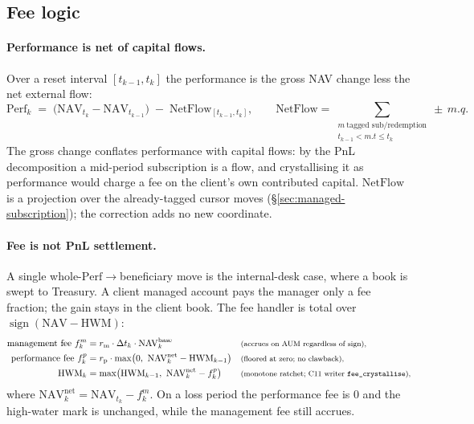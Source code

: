 \documentclass[11pt,a4paper]{article}
\begin{document}
\subsection{Fee logic}
\label{sec:managed-fees}

\paragraph{Performance is net of capital flows.} Over a reset interval $[t_{k-1},t_k]$ the
performance is the gross NAV change less the net external flow:
\[
\mathrm{Perf}_k \;=\; \big(\mathrm{NAV}_{t_k}-\mathrm{NAV}_{t_{k-1}}\big)\;-\;
\mathrm{NetFlow}_{[t_{k-1},t_k]},\qquad
\mathrm{NetFlow}=\!\!\sum_{\substack{m\ \text{tagged sub/redemption}\\ t_{k-1}<m.t\le t_k}}\!\!\pm\,m.q.
\]
The gross change conflates performance with capital flows: by the PnL decomposition a mid-period
subscription is a flow, and crystallising it as performance would charge a fee on the client's own
contributed capital. $\mathrm{NetFlow}$ is a projection over the already-tagged cursor moves
(\S\ref{sec:managed-subscription}); the correction adds no new coordinate.

\paragraph{Fee is not PnL settlement.} A single whole-$\mathrm{Perf}\to$beneficiary move is the
internal-desk case, where a book is swept to Treasury. A client managed account pays the manager
only a fee fraction; the gain stays in the client book. The fee handler is total over
$\operatorname{sign}(\mathrm{NAV}-\mathrm{HWM})$:
{\small\begin{align*}
\text{management fee } f^{m}_k &= r_{\text{m}}\cdot\Delta t_k\cdot \mathrm{NAV}^{\text{base}}_k
&&\text{\footnotesize(accrues on AUM regardless of sign),}\\
\text{performance fee } f^{p}_k &= r_{\text{p}}\cdot\max\!\big(0,\ \mathrm{NAV}^{\text{net}}_k-\mathrm{HWM}_{k-1}\big)
&&\text{\footnotesize(floored at zero; no clawback),}\\
\mathrm{HWM}_k &= \max\!\big(\mathrm{HWM}_{k-1},\ \mathrm{NAV}^{\text{net}}_k-f^{p}_k\big)
&&\text{\footnotesize(monotone ratchet; C11 writer \texttt{fee\_crystallise}),}
\end{align*}}
where $\mathrm{NAV}^{\text{net}}_k=\mathrm{NAV}_{t_k}-f^{m}_k$. On a loss period the performance
fee is $0$ and the high-water mark is unchanged, while the management fee still accrues.
\end{document}
